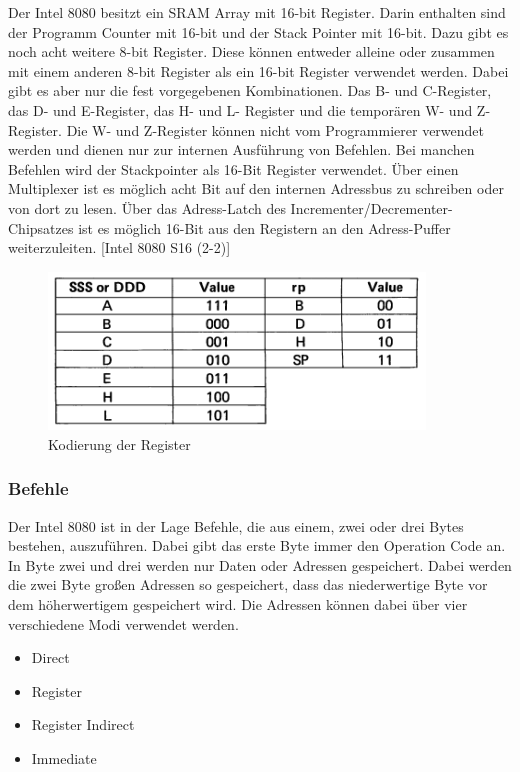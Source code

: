 \documentclass[12pt]{article}
\newcommand{\imgSpaceBefore}{\vspace{10pt}}
\begin{document}
Der Intel 8080 besitzt ein SRAM Array mit 16-bit Register. Darin enthalten sind der Programm Counter mit 16-bit und der Stack Pointer mit 16-bit. Dazu gibt es noch acht weitere 8-bit Register. Diese können entweder alleine oder zusammen mit einem anderen 8-bit Register als ein 16-bit Register verwendet werden. Dabei gibt es aber nur die fest vorgegebenen Kombinationen. Das B- und C-Register, das D- und E-Register, das H- und L- Register und die temporären W- und Z- Register. Die W- und Z-Register können nicht vom Programmierer verwendet werden und dienen nur zur internen Ausführung von Befehlen. Bei manchen Befehlen wird der Stackpointer als 16-Bit Register verwendet.
Über einen Multiplexer ist es möglich acht Bit auf den internen Adressbus zu schreiben oder von dort zu lesen. Über das Adress-Latch des Incrementer/Decrementer-Chipsatzes ist es möglich 16-Bit aus den Registern an den Adress-Puffer weiterzuleiten. [Intel 8080 S16 (2-2)]


\imgSpaceBefore
\begin{figure}[h]
\centering
\includegraphics[width=10cm]{Bilder/register_kodierung}
\caption{Kodierung der Register}
\label{fig:register_kodierung}
\end{figure}

\subsubsection{Befehle}

Der Intel 8080 ist in der Lage Befehle, die aus einem, zwei oder drei Bytes bestehen, auszuführen. Dabei gibt das erste Byte immer den Operation Code an. In Byte zwei und drei werden nur Daten oder Adressen gespeichert. Dabei werden die zwei Byte großen Adressen so gespeichert, dass das niederwertige Byte vor dem höherwertigem gespeichert wird. Die Adressen können dabei über vier verschiedene Modi verwendet werden.

\begin{itemize}
\item Direct
\item Register
\item Register Indirect
\item Immediate
\end{itemize}
\end{document}

